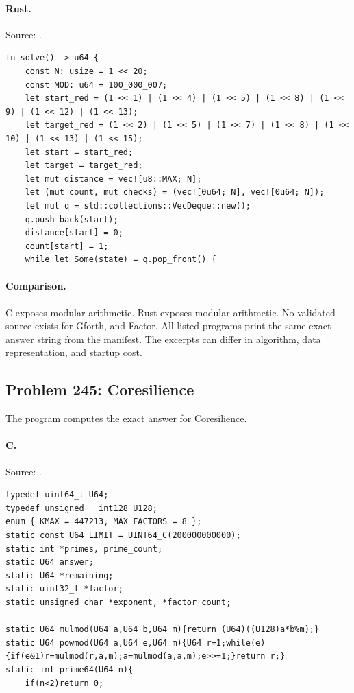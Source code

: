 \paragraph{Rust.} Source: .
\begin{lstlisting}
fn solve() -> u64 {
    const N: usize = 1 << 20;
    const MOD: u64 = 100_000_007;
    let start_red = (1 << 1) | (1 << 4) | (1 << 5) | (1 << 8) | (1 << 9) | (1 << 12) | (1 << 13);
    let target_red = (1 << 2) | (1 << 5) | (1 << 7) | (1 << 8) | (1 << 10) | (1 << 13) | (1 << 15);
    let start = start_red;
    let target = target_red;
    let mut distance = vec![u8::MAX; N];
    let (mut count, mut checks) = (vec![0u64; N], vec![0u64; N]);
    let mut q = std::collections::VecDeque::new();
    q.push_back(start);
    distance[start] = 0;
    count[start] = 1;
    while let Some(state) = q.pop_front() {
\end{lstlisting}

\paragraph{Comparison.}
C exposes modular arithmetic. Rust exposes modular arithmetic.
No validated source exists for Gforth, and Factor.
All listed programs print the same exact answer string from the manifest. The excerpts can differ in algorithm, data representation, and startup cost.

\subsection{Problem 245: Coresilience}
\label{walkthrough:p245}
The program computes the exact answer for Coresilience.

\paragraph{C.} Source: .
\begin{lstlisting}
typedef uint64_t U64;
typedef unsigned __int128 U128;
enum { KMAX = 447213, MAX_FACTORS = 8 };
static const U64 LIMIT = UINT64_C(200000000000);
static int *primes, prime_count;
static U64 answer;
static U64 *remaining;
static uint32_t *factor;
static unsigned char *exponent, *factor_count;

static U64 mulmod(U64 a,U64 b,U64 m){return (U64)((U128)a*b%m);}
static U64 powmod(U64 a,U64 e,U64 m){U64 r=1;while(e){if(e&1)r=mulmod(r,a,m);a=mulmod(a,a,m);e>>=1;}return r;}
static int prime64(U64 n){
    if(n<2)return 0;
\end{lstlisting}

